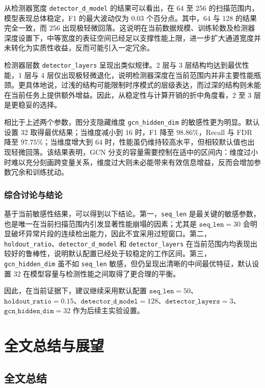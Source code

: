 \documentclass[bachelor, vlined]{DissertUESTC}
\begin{document}
    从检测器宽度 \texttt{detector\_d\_model} 的结果可以看出，在 64 至 256 的扫描范围内，模型表现总体稳定，F1 的最大波动仅为 0.03 个百分点。其中，64 与 128 的结果完全一致，而 256 出现极轻微回落。这说明在当前数据规模、训练轮数及检测器深度设置下，中等宽度的表征空间已经足以支撑性能上限，进一步扩大通道宽度并未转化为实质性收益，反而可能引入一定冗余。
    
    检测器层数 \texttt{detector\_layers} 呈现出类似规律。2 层与 3 层结构均达到最优性能，1 层与 4 层仅出现极轻微退化，说明检测器深度在当前范围内并非主要性能瓶颈。更具体地说，过浅的结构可能限制时序模式的层级表达，而过深的结构则未能在当前任务上提供额外增益。因此，从稳定性与计算开销的折中角度看，2 至 3 层是更稳妥的选择。
    
    相比于上述两个参数，图分支隐藏维度 \texttt{gcn\_hidden\_dim} 的敏感性更为明显。默认设置 32 取得最优结果；当维度减小到 16 时，F1 降至 \(98.86\%\)，Recall 与 FDR 降至 \(97.75\%\)；当维度增大到 64 时，性能虽仍维持较高水平，但相较默认值也出现轻微回落。该结果表明，GCN 分支的容量需要控制在适中的区间内：维度过小时难以充分刻画跨变量关系，维度过大则未必能带来有效信息增益，反而会增加参数冗余和训练扰动。
    
    \subsection{综合讨论与结论}
    
    基于当前敏感性结果，可以得到以下结论。第一，\texttt{seq\_len} 是最关键的敏感参数，也是唯一在当前扫描范围内引发显著性能崩塌的因素；尤其是 \(\texttt{seq\_len}=30\) 会明显破坏异常片段的连续检出能力，因此不宜采用过短窗口。第二，\texttt{holdout\_ratio}、\texttt{detector\_d\_model} 和 \texttt{detector\_layers} 在当前范围内均表现出较好的鲁棒性，说明默认配置已经处于较稳定的工作区间。第三，\texttt{gcn\_hidden\_dim} 虽不如 \texttt{seq\_len} 敏感，但仍呈现出清晰的中间最优特征，默认设置 32 在模型容量与检测性能之间取得了更合理的平衡。
    
    因此，在当前证据下，建议继续采用默认配置 \(\texttt{seq\_len}=50\)、\(\texttt{holdout\_ratio}=0.15\)、\(\texttt{detector\_d\_model}=128\)、\(\texttt{detector\_layers}=3\)、\(\texttt{gcn\_hidden\_dim}=32\) 作为后续主实验设置。

	    \chapter{全文总结与展望}

        \section{全文总结}
\end{document}
